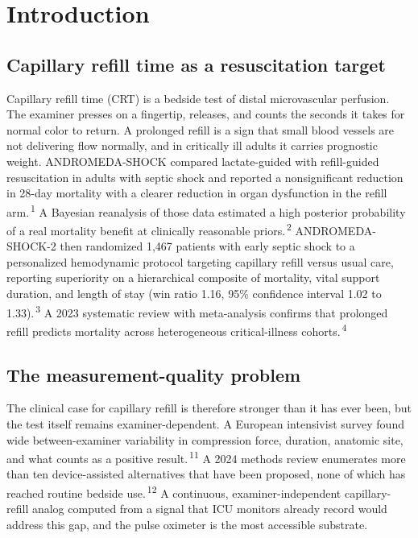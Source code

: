 \documentclass[twocolumn,letterpaper,10pt]{article}
\renewcommand{\cite}[1]{\textsuperscript{\,#1}}
\begin{document}
\section{Introduction}

\subsection{Capillary refill time as a resuscitation target}

Capillary refill time (CRT) is a bedside test of distal microvascular perfusion. The examiner presses on a fingertip, releases, and counts the seconds it takes for normal color to return. A prolonged refill is a sign that small blood vessels are not delivering flow normally, and in critically ill adults it carries prognostic weight. ANDROMEDA-SHOCK compared lactate-guided with refill-guided resuscitation in adults with septic shock and reported a nonsignificant reduction in 28-day mortality with a clearer reduction in organ dysfunction in the refill arm.\cite{1} A Bayesian reanalysis of those data estimated a high posterior probability of a real mortality benefit at clinically reasonable priors.\cite{2} ANDROMEDA-SHOCK-2 then randomized 1{,}467 patients with early septic shock to a personalized hemodynamic protocol targeting capillary refill versus usual care, reporting superiority on a hierarchical composite of mortality, vital support duration, and length of stay (win ratio 1.16, 95\% confidence interval 1.02 to 1.33).\cite{3} A 2023 systematic review with meta-analysis confirms that prolonged refill predicts mortality across heterogeneous critical-illness cohorts.\cite{4}

\subsection{The measurement-quality problem}

The clinical case for capillary refill is therefore stronger than it has ever been, but the test itself remains examiner-dependent. A European intensivist survey found wide between-examiner variability in compression force, duration, anatomic site, and what counts as a positive result.\cite{11} A 2024 methods review enumerates more than ten device-assisted alternatives that have been proposed, none of which has reached routine bedside use.\cite{12} A continuous, examiner-independent capillary-refill analog computed from a signal that ICU monitors already record would address this gap, and the pulse oximeter is the most accessible substrate.
\end{document}
